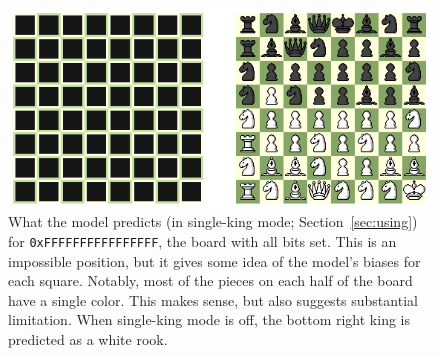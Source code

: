\documentclass[twocolumn]{amsart}
\begin{document}
\begin{figure}[ht]
\includegraphics[width=0.9 \linewidth]{blind-allon}
\caption{What the model predicts (in single-king mode;
  Section~\ref{sec:using}) for {\tt 0xFFFFFFFFFFFFFFFF}, the board
  with all bits set. This is an impossible position, but it gives some
  idea of the model's biases for each square. Notably, most of the pieces
  on each half of the board have a single color. This makes sense, but
  also suggests substantial limitation. When single-king mode is off,
  the bottom right king is predicted as a white rook.} \label{fig:allon}
\end{figure}

% 
% 
% 
% 
% 
% 
% 
% 
% 

{}

\end{document}
